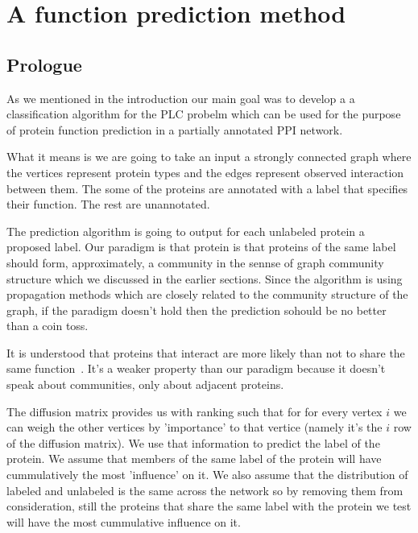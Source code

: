 
\section{A function prediction method}
\subsection*{Prologue}
As we mentioned in the introduction our main goal was to develop a
a classification algorithm for the PLC probelm which can be used for the
purpose of protein function prediction in a partially annotated PPI
network.

What it means is we are going to take an input a strongly connected
graph where the vertices represent protein types and the edges represent
observed interaction between them. The some of the proteins are
annotated with a label that specifies their function. The rest are
unannotated.

The prediction algorithm is going to output for each unlabeled protein a
proposed label. Our paradigm is that protein is that proteins of the
same label should form, approximately, a community in the sennse of
graph community structure which we discussed in the earlier sections.
Since the algorithm is using propagation methods which are closely
related to the community structure of the graph, if the paradigm doesn't
hold then the prediction sohould be no better than a coin toss.

It is understood that proteins that interact are more likely than not to
share the same function~\cite{schwikowski2000network}. It's a weaker
property than our paradigm because it doesn't speak about communities,
only about adjacent proteins.

The diffusion matrix provides us with ranking such that for for every
vertex $i$ we can weigh the other vertices by 'importance' to that
vertice (namely it's the $i$ row of the diffusion matrix). We use that
information to predict the label of the protein. We assume that members
of the same label of the protein will have cummulatively the most
'influence' on it. We also assume that the distribution of labeled and
unlabeled is the same across the network so by removing them from
consideration, still the proteins that share the same label with the
protein we test will have the most cummulative influence on it.

\subsection*{}

